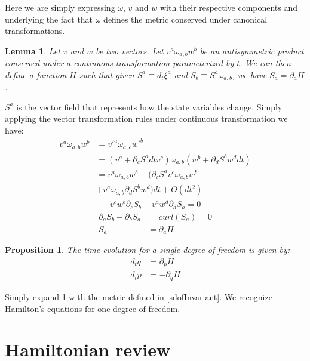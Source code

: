 \documentclass[aps,pra,10pt,twocolumn,floatfix,nofootinbib]{revtex4-1}
\newtheorem{lem}[thm]{Lemma}
\newtheorem{prop}[thm]{Proposition}
\theoremstyle{definition}
\begin{document}
Here we are simply expressing $\omega$, $v$ and $w$ with their respective components and underlying the fact that $\omega$ defines the metric conserved under canonical transformations.

\begin{lem}\label{genAntisim}
Let $v$ and $w$ be two vectors. Let $v^{a} \omega_{a, b} w^{b}$ be an antisymmetric product conserved under a continuous transformation parameterized by $t$. We can then define a function $H$ such that given $S^{a} \equiv d_{t}\xi^{a}$ and $S_{b} \equiv S^{a} \omega_{a, b}$, we have $S_{a} = \partial_{a}H$.
\end{lem}

$S^{a}$ is the vector field that represents how the state variables change. Simply applying the vector transformation rules under continuous transformation we have:
\begin{align*}
v^{a} \omega_{a, b} w^{b} &= v'^{a} \omega_{a, c} w'^{b}  \\
&= (v^{a} + \partial_{c} S^{a} dt v^{c}) \omega_{a, b} ( w^{b} + \partial_{d} S^{b} w^{d} dt) \\
&= v^{a} \omega_{a, b} w^{b} + (\partial_{c} S^{a} v^{c} \omega_{a, b} w^{b} \\
 &+ v^{a} \omega_{a, b} \partial_{d} S^{b} w^{d}) dt + O(dt^2)
\end{align*}
\begin{align*}
v^{c} w^{b} \partial_{c} S_{b} - v^{a} w^{d} \partial_{d} S_{a} = 0
\end{align*}
\begin{align*}
\partial_{a} S_{b} - \partial_{b} S_{a} &= curl(S_{a}) = 0 \\
S_{a} &= \partial_{a}H
\end{align*}

\begin{prop}\label{sdofHam}
The time evolution for a single degree of freedom is given by:
\begin{align*}
d_{t}q &= \partial_{p} H \\
d_{t}p &= - \partial_{q} H
\end{align*}
\end{prop}

Simply expand \ref{genAntisim} with the metric defined in \ref{sdofInvariant}. We recognize Hamilton's equations for one degree of freedom\cite{classical_dynamics}.

\section{Hamiltonian review}
\end{document}
